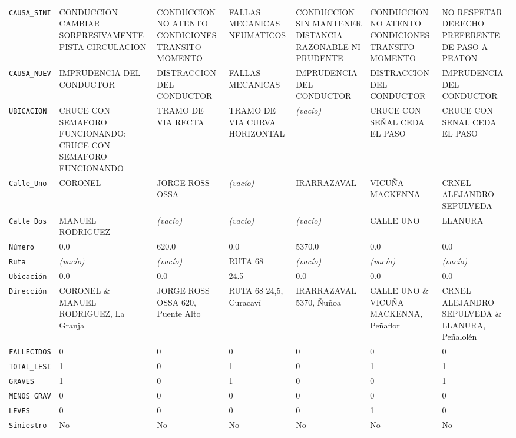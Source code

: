 \documentclass[10pt]{article}
\begin{document}
\begin{xltabular}{\linewidth}{@{}p{4.3cm} Y Y Y Y Y Y @{}}
\texttt{CAUSA\_\allowbreak{}SINI} & CONDUCCION CAMBIAR SORPRESIV\allowbreak{}AMENTE PISTA CIRCULACION & CONDUCCION NO ATENTO CONDICIONES TRANSITO MOMENTO & FALLAS MECANICAS NEUMATICOS & CONDUCCION SIN MANTENER DISTANCIA RAZONABLE NI PRUDENTE & CONDUCCION NO ATENTO CONDICIONES TRANSITO MOMENTO & NO RESPETAR DERECHO PREFERENTE DE PASO A PEATON \\
\texttt{CAUSA\_\allowbreak{}NUEV} & IMPRUDENCIA DEL CONDUCTOR & DISTRACCION DEL CONDUCTOR & FALLAS MECANICAS & IMPRUDENCIA DEL CONDUCTOR & DISTRACCION DEL CONDUCTOR & IMPRUDENCIA DEL CONDUCTOR \\
\texttt{UBICACION} & CRUCE CON SEMAFORO FUNCIONANDO; CRUCE CON SEMAFORO FUNCIONANDO & TRAMO DE VIA RECTA & TRAMO DE VIA CURVA HORIZONTAL & \textit{\color{gris}(vacío)} & CRUCE CON SEÑAL CEDA EL PASO & CRUCE CON SENAL CEDA EL PASO \\
\texttt{Calle\_\allowbreak{}Uno} & CORONEL & JORGE ROSS OSSA & \textit{\color{gris}(vacío)} & IRARRAZAVAL & VICUÑA MACKENNA & CRNEL ALEJANDRO SEPULVEDA \\
\texttt{Calle\_\allowbreak{}Dos} & MANUEL RODRIGUEZ & \textit{\color{gris}(vacío)} & \textit{\color{gris}(vacío)} & \textit{\color{gris}(vacío)} & CALLE UNO & LLANURA \\
\texttt{Número} & 0.0 & 620.0 & 0.0 & 5370.0 & 0.0 & 0.0 \\
\texttt{Ruta} & \textit{\color{gris}(vacío)} & \textit{\color{gris}(vacío)} & RUTA 68 & \textit{\color{gris}(vacío)} & \textit{\color{gris}(vacío)} & \textit{\color{gris}(vacío)} \\
\texttt{Ubicación} & 0.0 & 0.0 & 24.5 & 0.0 & 0.0 & 0.0 \\
\texttt{Dirección} & CORONEL \& MANUEL RODRIGUEZ, La Granja & JORGE ROSS OSSA 620, Puente Alto & RUTA 68 24,5, Curacaví & IRARRAZAVAL 5370, Ñuñoa & CALLE UNO \& VICUÑA MACKENNA, Peñaflor & CRNEL ALEJANDRO SEPULVEDA \& LLANURA, Peñalolén \\
\texttt{FALLECIDOS} & 0 & 0 & 0 & 0 & 0 & 0 \\
\texttt{TOTAL\_\allowbreak{}LESI} & 1 & 0 & 1 & 0 & 1 & 1 \\
\texttt{GRAVES} & 1 & 0 & 1 & 0 & 0 & 1 \\
\texttt{MENOS\_\allowbreak{}GRAV} & 0 & 0 & 0 & 0 & 0 & 0 \\
\texttt{LEVES} & 0 & 0 & 0 & 0 & 1 & 0 \\
\texttt{Siniestro} & No & No & No & No & No & No \\

\end{xltabular}
\end{document}
